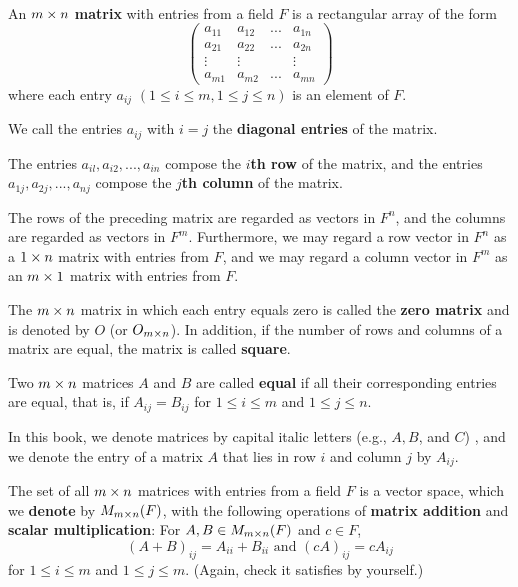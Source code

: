 \begin{additional definition} \label{adef 1.3}\ 

 An \(m \times n\) \textbf{matrix} with entries from a field \(F\) is a rectangular array of the form
\[
\begin{pmatrix}
  a_{11} & a_{12} & ... & a_{1n} \\
  a_{21} & a_{22} & ... & a_{2n} \\
  \vdots & \vdots &     & \vdots  \\
  a_{m1} & a_{m2} & ... & a_{mn}
\end{pmatrix}
\]
where each entry \(a_{ij}\) \((1 \le i \le m, 1 \le j \le n)\) is an element of \(F\).

 We call the entries \(a_{ij}\) with \(i = j\) the \textbf{diagonal entries} of the matrix.

 The entries \(a_{il}, a_{i2}, ..., a_{in}\) compose the \textbf{\(i\)th row} of the matrix, and the entries \(a_{1j}, a_{2j}, ... , a_{nj}\) compose the \textbf{\(j\)th column} of the matrix.

 The rows of the preceding matrix are regarded as vectors in \(F^n\), and the columns are regarded as vectors in \(F^m\).
Furthermore, we may regard a row vector in \(F^n\) as a \(1 \times n\) matrix with entries from \(F\), and we may regard a column vector in \(F^m\) as an \(m \times 1\) matrix with entries from \(F\).

 The \(m \times n\) matrix in which each entry equals zero is called the \textbf{zero matrix} and is denoted by \(O\) (or \(O_{m \times n}\)).
In addition, if the number of rows and columns of a matrix are equal, the matrix is called \textbf{square}.

 Two \(m \times n\) matrices \(A\) and \(B\) are called \textbf{equal} if all their corresponding entries are equal, that is, if \(A_{ij} = B_{ij}\) for \(1 \le i \le m\) and \(1 \le j \le n\).

 In this book, we denote matrices by capital italic letters (e.g., \(A, B\), and \(C\)) , and we denote the entry of a matrix \(A\) that lies in row \(i\) and column \(j\) by \(A_{ij}\).
\end{additional definition}

\begin{example} \label{example 1.2.2}
The set of all \(m \times n\) matrices with entries from a field \(F\) is a vector space, which we \textbf{denote} by \(M_{m \times n}(F)\), with the following operations of \textbf{matrix addition} and \textbf{scalar multiplication}:
For \(A, B \in M_{m \times n}(F)\) and \(c \in F\),
\[
    (A + B)_{ij} = A_{ii} + B_{ii} \text{ and } (cA)_{ij} = cA_{ij}
\]
for \(1 \le i \le m\) and \(1 \le j \le m\).
(Again, check it satisfies  by yourself.)
\end{example}

